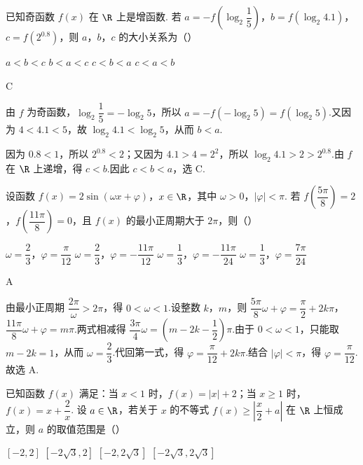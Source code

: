 \begin{problem}
已知奇函数 \(f(x)\) 在 \(\R\) 上是增函数. 若 \(a=-f\!\left(\log_2\dfrac15\right)\)，\(b=f(\log_2 4.1)\)，\(c=f(2^{0.8})\)，则 \(a\)，\(b\)，\(c\) 的大小关系为（\quad）

\choices
    {\(a<b<c\)}
    {\(b<a<c\)}
    {\(c<b<a\)}
    {\(c<a<b\)}
\end{problem}

\begin{answer}
C
\end{answer}

\begin{solution}
由 \(f\) 为奇函数，\(\log_2\dfrac15=-\log_2 5\)，所以
\(a=-f(-\log_2 5)=f(\log_2 5)\).又因为 \(4<4.1<5\)，故 \(\log_2 4.1<\log_2 5\)，从而 \(b<a\).

因为 \(0.8<1\)，所以 \(2^{0.8}<2\)；又因为 \(4.1>4=2^2\)，所以 \(\log_2 4.1>2>2^{0.8}\).由 \(f\) 在 \(\R\) 上递增，得 \(c<b\).因此 \(c<b<a\)，选 C.
\end{solution}

\begin{problem}
设函数 \(f(x)=2\sin(\omega x+\varphi)\)，\(x\in\R\)，其中 \(\omega>0\)，\(|\varphi|<\pi\). 若 \(f\!\left(\dfrac{5\pi}{8}\right)=2\)，\(f\!\left(\dfrac{11\pi}{8}\right)=0\)，且 \(f(x)\) 的最小正周期大于 \(2\pi\)，则（\quad）

\choices
    {\(\omega=\dfrac23\)，\(\varphi=\dfrac\pi{12}\)}
    {\(\omega=\dfrac23\)，\(\varphi=-\dfrac{11\pi}{12}\)}
    {\(\omega=\dfrac13\)，\(\varphi=-\dfrac{11\pi}{24}\)}
    {\(\omega=\dfrac13\)，\(\varphi=\dfrac{7\pi}{24}\)}
\end{problem}

\begin{answer}
A
\end{answer}

\begin{solution}
由最小正周期 \(\dfrac{2\pi}{\omega}>2\pi\)，得 \(0<\omega<1\).设整数 \(k\)，\(m\)，则
\(\dfrac{5\pi}{8}\omega+\varphi=\dfrac\pi2+2k\pi\)，\(\dfrac{11\pi}{8}\omega+\varphi=m\pi\).两式相减得
\(\dfrac{3\pi}{4}\omega=\left(m-2k-\dfrac12\right)\pi\).由于 \(0<\omega<1\)，只能取 \(m-2k=1\)，从而 \(\omega=\dfrac23\).代回第一式，得 \(\varphi=\dfrac\pi{12}+2k\pi\).结合 \(|\varphi|<\pi\)，得 \(\varphi=\dfrac\pi{12}\).故选 A.
\end{solution}

\begin{problem}
已知函数 \(f(x)\) 满足：当 \(x<1\) 时，\(f(x)=|x|+2\)；当 \(x\ge 1\) 时，\(f(x)=x+\dfrac2x\). 设 \(a\in\R\)，若关于 \(x\) 的不等式 \(f(x)\ge \left|\dfrac x2+a\right|\) 在 \(\R\) 上恒成立，则 \(a\) 的取值范围是（\quad）

\choices
    {\([-2,2]\)}
    {\([-2\sqrt3,2]\)}
    {\([-2,2\sqrt3]\)}
    {\([-2\sqrt3,2\sqrt3]\)}
\end{problem}

